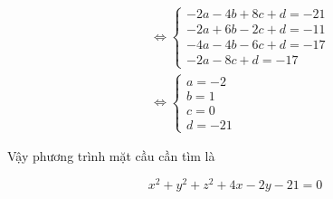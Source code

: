\begin{vd}
{\begin{enumEX}[a)]{1}
		$$
		\begin{aligned}
			& \Leftrightarrow\left\{\begin{array}{l}
				-2 a-4 b+8 c+d=-21 \\
				-2 a+6 b-2 c+d=-11 \\
				-4 a-4 b-6 c+d=-17 \\
				-2 a-8 c+d=-17
			\end{array}\right. \\
			& \Leftrightarrow\left\{\begin{array}{c}
				a=-2 \\
				b=1 \\
				c=0 \\
				d=-21
			\end{array}\right.
		\end{aligned}
		$$
		
		
		Vậy phương trình mặt cầu cần tìm là
		
		$$
		x^2+y^2+z^2+4 x-2 y-21=0
		$$
		
	\end{enumEX}
}
\end{vd}
